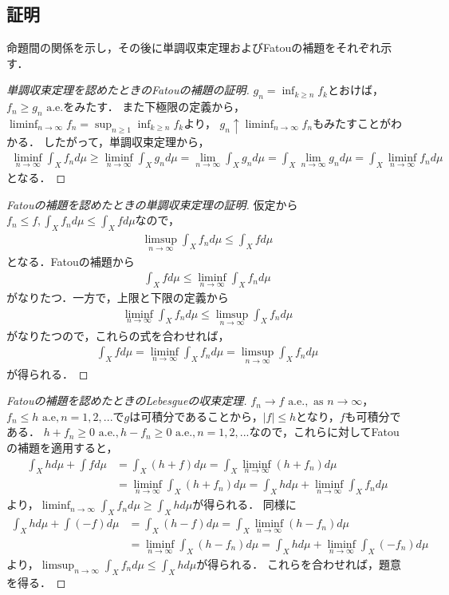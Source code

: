 \documentclass[a4paper,10pt]{jsarticle}
\theoremstyle{definition}
\newcommand{\eq}[1]{\begin{align}#1\end{align}}
\begin{document}
\subsection*{証明}
命題間の関係を示し，その後に単調収束定理およびFatouの補題をそれぞれ示す．
\begin{proof}[単調収束定理を認めたときのFatouの補題の証明]
$g_n=\inf_{k\ge n}f_k$とおけば，$f_n\ge g_n\text{ a.e.}$をみたす．
また下極限の定義から，$\liminf_{n\rightarrow\infty}f_n=\sup_{n\ge1}\inf_{k\ge n}f_k$より，
$g_n\uparrow\liminf_{n\rightarrow\infty}f_n$もみたすことがわかる．
したがって，単調収束定理から，
\eq{
	\liminf_{n\rightarrow\infty}\int_Xf_nd\mu\ge\liminf_{n\rightarrow\infty}\int_Xg_nd\mu=\lim_{n\rightarrow\infty}\int_Xg_nd\mu
	=\int_X\lim_{n\rightarrow\infty}g_nd\mu=\int_X\liminf_{n\rightarrow\infty}f_nd\mu}
となる．
\end{proof}
\begin{proof}[Fatouの補題を認めたときの単調収束定理の証明]
仮定から$f_n\le f,\int_Xf_nd\mu\le\int_Xfd\mu$なので，
\eq{\limsup_{n\rightarrow\infty}\int_Xf_nd\mu\le\int_Xfd\mu}
となる．Fatouの補題から
\eq{\int_Xfd\mu\le\liminf_{n\rightarrow\infty}\int_Xf_nd\mu}
がなりたつ．一方で，上限と下限の定義から
\eq{\liminf_{n\rightarrow\infty}\int_Xf_nd\mu\le\limsup_{n\rightarrow\infty}\int_Xf_nd\mu}
がなりたつので，これらの式を合わせれば，
\eq{\int_Xfd\mu=\liminf_{n\rightarrow\infty}\int_Xf_nd\mu=\limsup_{n\rightarrow\infty}\int_Xf_nd\mu}
が得られる．
\end{proof}
\begin{proof}[Fatouの補題を認めたときのLebesgueの収束定理]
$f_n\rightarrow f\text{ a.e.},\text{ as }n\rightarrow\infty$，$f_n\le h\text{ a.e},n=1,2,...$で$g$は可積分であることから，$|f|\le h$となり，$f$も可積分である．
$h+f_n\ge0\text{ a.e.},h-f_n\ge0\text{ a.e.},n=1,2,...$なので，これらに対してFatouの補題を適用すると，
\eq{	\int_Xhd\mu+\int fd\mu&=\int_X(h+f)d\mu=\int_X\liminf_{n\rightarrow\infty}(h+f_n)d\mu\\&=\liminf_{n\rightarrow\infty}\int_X(h+f_n)d\mu=\int_Xhd\mu+\liminf_{n\rightarrow\infty}\int_Xf_nd\mu}
より，$\liminf_{n\rightarrow\infty}\int_Xf_nd\mu\ge\int_Xhd\mu$が得られる．
同様に
\eq{	\int_Xhd\mu+\int(-f)d\mu&=\int_X(h-f)d\mu=\int_X\liminf_{n\rightarrow\infty}(h-f_n)d\mu\\&=\liminf_{n\rightarrow\infty}\int_X(h-f_n)d\mu=\int_Xhd\mu+\liminf_{n\rightarrow\infty}\int_X(-f_n)d\mu}
より，$\limsup_{n\rightarrow\infty}\int_Xf_nd\mu\le\int_Xhd\mu$が得られる．
これらを合わせれば，題意を得る．
\end{proof}
\end{document}
